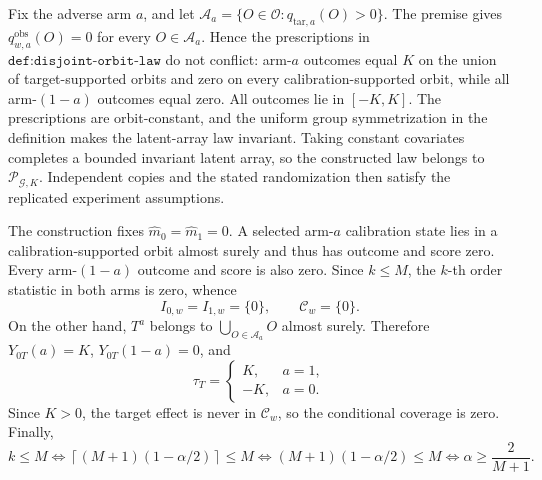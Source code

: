 Fix the adverse arm \(a\), and let \(\mathcal A_a=\{O\in\mathcal O:q_{\mathrm{tar},a}(O)>0\}\). The premise gives \(q^{\mathrm{obs}}_{w,a}(O)=0\) for every \(O\in\mathcal A_a\). Hence the prescriptions in \(\texttt{def:disjoint-orbit-law}\) do not conflict: arm-\(a\) outcomes equal \(K\) on the union of target-supported orbits and zero on every calibration-supported orbit, while all arm-\((1-a)\) outcomes equal zero. All outcomes lie in \([-K,K]\). The prescriptions are orbit-constant, and the uniform group symmetrization in the definition makes the latent-array law invariant. Taking constant covariates completes a bounded invariant latent array, so the constructed law belongs to \(\mathcal P_{\mathcal G,K}\). Independent copies and the stated randomization then satisfy the replicated experiment assumptions.

The construction fixes \(\widehat m_0=\widehat m_1=0\). A selected arm-\(a\) calibration state lies in a calibration-supported orbit almost surely and thus has outcome and score zero. Every arm-\((1-a)\) outcome and score is also zero. Since \(k\le M\), the \(k\)-th order statistic in both arms is zero, whence \[I_{0,w}=I_{1,w}=\{0\},\qquad\mathcal C_w=\{0\}.\] On the other hand, \(T^a\) belongs to \(\bigcup_{O\in\mathcal A_a}O\) almost surely. Therefore \(Y_{0T}(a)=K\), \(Y_{0T}(1-a)=0\), and \[\tau_T=\begin{cases}K,&a=1,\\-K,&a=0.\end{cases}\] Since \(K>0\), the target effect is never in \(\mathcal C_w\), so the conditional coverage is zero. Finally, \[k\le M\iff\left\lceil(M+1)(1-\alpha/2)\right\rceil\le M\iff(M+1)(1-\alpha/2)\le M\iff\alpha\ge\frac{2}{M+1}.\]